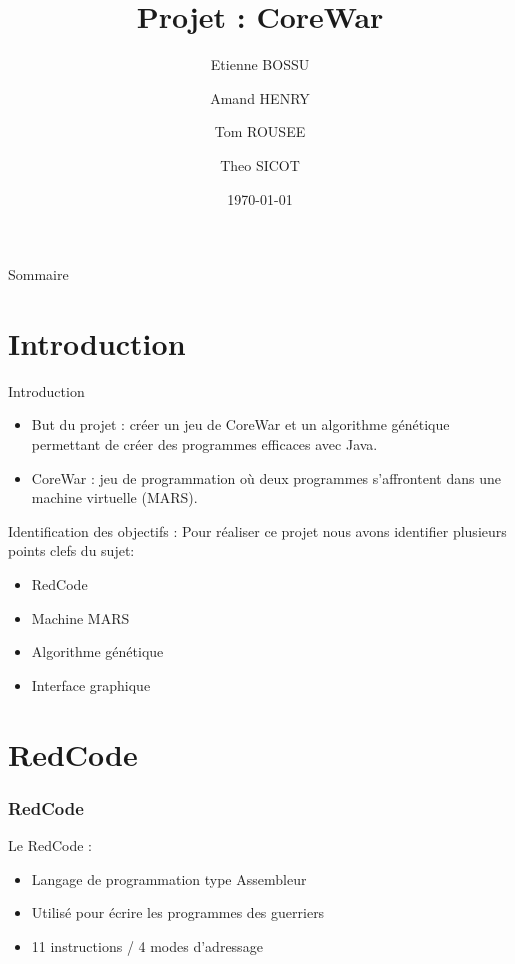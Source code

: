 \documentclass{beamer}
\title{Projet : CoreWar}
\author{Etienne BOSSU\and{}Amand HENRY\and{}Tom ROUSEE\and{}Theo SICOT}
\date{\today}
\begin{document}
\begin{frame}
    \titlepage
\end{frame}

\begin{frame}{Sommaire}
    \tableofcontents
\end{frame}

\section{Introduction}
\begin{frame}{Introduction}
    \begin{itemize}
        \item But du projet : créer un jeu de CoreWar et un algorithme génétique permettant de créer des programmes efficaces avec Java.
        \vspace{\baselineskip}
        \item CoreWar : jeu de programmation où deux programmes s'affrontent dans une machine virtuelle (MARS).
    \end{itemize}
\end{frame}

\begin{frame}{Identification des objectifs :}
    Pour réaliser ce projet nous avons identifier plusieurs points clefs  du sujet:
    \vspace{\baselineskip}
    \begin{itemize}
        \item RedCode
        \item Machine MARS
        \item Algorithme génétique
        \item Interface graphique
    \end{itemize}
\end{frame}

\section{RedCode}
\begin{frame}
    \frametitle{RedCode}
    Le RedCode :
    \begin{itemize}
        \item Langage de programmation type Assembleur
        \item Utilisé pour écrire les programmes des guerriers
        \item 11 instructions / 4 modes d'adressage
    \end{itemize}
\end{frame}
\end{document}
